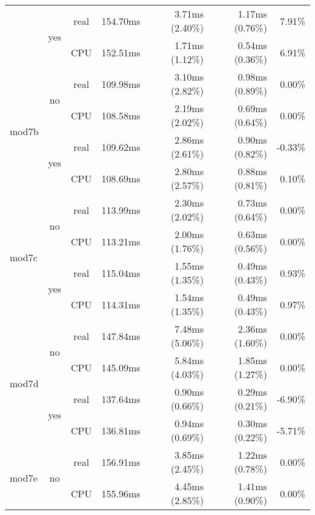 \documentclass[en]{pracamgr}
\begin{document}
\begin{small}
\begin{longtable}{|l|c|c|r|r|r|r|}
                          \cline{2-7}
                          & \multirow{2}{*}{yes} & real & 154.70ms & 3.71ms (2.40\%) & 1.17ms (0.76\%) & 7.91\% \\*
                          &                      & CPU  & 152.51ms & 1.71ms (1.12\%) & 0.54ms (0.36\%) & 6.91\% \\
\hline
\multirow{4}{*}{mod7b}    & \multirow{2}{*}{no}  & real & 109.98ms & 3.10ms (2.82\%) & 0.98ms (0.89\%) & 0.00\% \\*
                          &                      & CPU  & 108.58ms & 2.19ms (2.02\%) & 0.69ms (0.64\%) & 0.00\% \\*
                          \cline{2-7}
                          & \multirow{2}{*}{yes} & real & 109.62ms & 2.86ms (2.61\%) & 0.90ms (0.82\%) & -0.33\% \\*
                          &                      & CPU  & 108.69ms & 2.80ms (2.57\%) & 0.88ms (0.81\%) & 0.10\% \\
\hline
\multirow{4}{*}{mod7c}    & \multirow{2}{*}{no}  & real & 113.99ms & 2.30ms (2.02\%) & 0.73ms (0.64\%) & 0.00\% \\*
                          &                      & CPU  & 113.21ms & 2.00ms (1.76\%) & 0.63ms (0.56\%) & 0.00\% \\*
                          \cline{2-7}
                          & \multirow{2}{*}{yes} & real & 115.04ms & 1.55ms (1.35\%) & 0.49ms (0.43\%) & 0.93\% \\*
                          &                      & CPU  & 114.31ms & 1.54ms (1.35\%) & 0.49ms (0.43\%) & 0.97\% \\
\hline
\multirow{4}{*}{mod7d}    & \multirow{2}{*}{no}  & real & 147.84ms & 7.48ms (5.06\%) & 2.36ms (1.60\%) & 0.00\% \\*
                          &                      & CPU  & 145.09ms & 5.84ms (4.03\%) & 1.85ms (1.27\%) & 0.00\% \\*
                          \cline{2-7}
                          & \multirow{2}{*}{yes} & real & 137.64ms & 0.90ms (0.66\%) & 0.29ms (0.21\%) & -6.90\% \\*
                          &                      & CPU  & 136.81ms & 0.94ms (0.69\%) & 0.30ms (0.22\%) & -5.71\% \\
\hline
\multirow{4}{*}{mod7e}    & \multirow{2}{*}{no}  & real & 156.91ms & 3.85ms (2.45\%) & 1.22ms (0.78\%) & 0.00\% \\*
                          &                      & CPU  & 155.96ms & 4.45ms (2.85\%) & 1.41ms (0.90\%) & 0.00\% \\*

\end{longtable}
\end{small}
\end{document}

